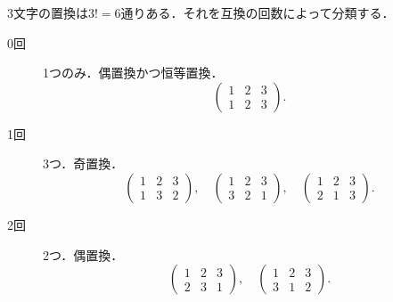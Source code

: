 \documentclass[a4paper,10pt,fleqn]{ltjsarticle}
\begin{document}
\begin{tleftbar}
    3文字の置換は$3!=6$通りある．それを互換の回数によって分類する．
    \begin{description}
        \item[0回] 1つのみ．偶置換かつ恒等置換．
              \[
                  \begin{pmatrix} 1 & 2 & 3 \\ 1 & 2 & 3 \end{pmatrix}.
              \]
        \item [1回] 3つ．奇置換．
              \[
                  \begin{pmatrix} 1 & 2 & 3\\ 1 & 3 & 2 \end{pmatrix},\quad
                  \begin{pmatrix} 1 & 2 & 3\\ 3 & 2 & 1 \end{pmatrix},\quad
                  \begin{pmatrix} 1 & 2 & 3\\ 2 & 1 & 3 \end{pmatrix}.
              \]
        \item [2回] 2つ．偶置換．
              \[
                  \begin{pmatrix} 1 & 2 & 3\\ 2 & 3 & 1 \end{pmatrix},\quad
                  \begin{pmatrix} 1 & 2 & 3\\ 3 & 1 & 2 \end{pmatrix}.
              \]
    \end{description}
\end{tleftbar}

\end{document}
